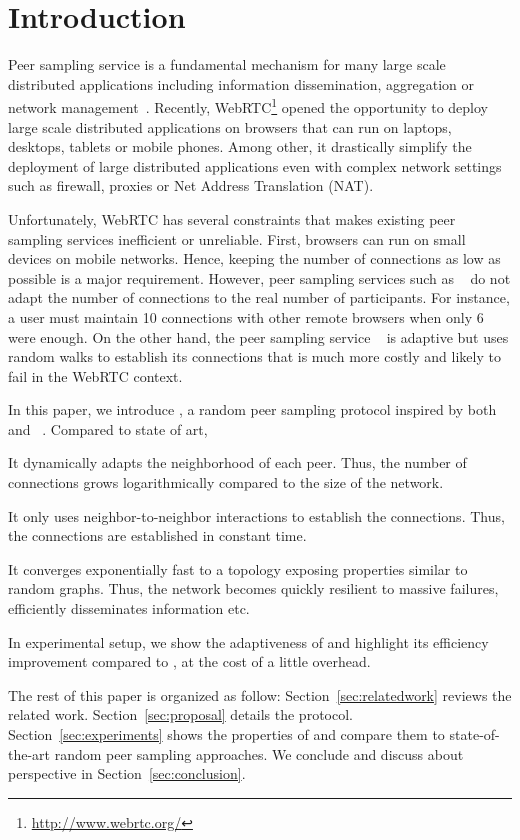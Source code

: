 
\section{Introduction}

Peer sampling service is a fundamental mechanism for many large scale
distributed applications including information dissemination, aggregation
 or network management~\cite{jelasity2007gossip}. Recently,
WebRTC\footnote{\url{http://www.webrtc.org/}} opened the opportunity to deploy large scale distributed
applications on browsers that can run on laptops, desktops, tablets or mobile
phones. Among other, it drastically simplify the deployment of large
distributed applications even with complex network settings such as firewall,
proxies or Net Address Translation (NAT).

Unfortunately, WebRTC has several constraints that makes existing peer
sampling services inefficient or unreliable. First, browsers can run
on small devices on mobile networks. Hence, keeping the number of
connections as low as possible is a major requirement. However, peer
sampling services such as \CYCLON{}~\cite{ voulgaris2005cyclon} do not
adapt the number of connections to the real number of
participants. For instance, a user must maintain 10 connections with
other remote browsers when only 6 were enough. On the other hand, the
peer sampling service \SCAMP{}~\cite{ganesh2003peer} is adaptive but
uses random walks to establish its connections that is much more
costly and likely to fail in the WebRTC context.

In this paper, we introduce \SPRAY{}, a random peer sampling protocol
inspired by both \SCAMP{}~\cite{ganesh2003peer} and
\CYCLON{}~\cite{voulgaris2005cyclon}. Compared to state of art,
\begin{inparaenum}[(i)]
\item It dynamically adapts the neighborhood of each peer. Thus, the number of
  connections grows logarithmically compared to the size of the network.
\item It only uses neighbor-to-neighbor interactions to establish the
  connections. Thus, the connections are established in constant time.
\item It converges exponentially fast to a topology exposing properties similar
  to random graphs. Thus, the network becomes quickly resilient to massive
  failures, efficiently disseminates information etc.
\item In experimental setup, we show the adaptiveness of \SPRAY{} and
  highlight its efficiency improvement compared to \CYCLON{}, at the cost of a
  little overhead.
\end{inparaenum}

The rest of this paper is organized as follow: Section~\ref{sec:relatedwork}
reviews the related work. Section~\ref{sec:proposal} details the \SPRAY{}
protocol.  Section~\ref{sec:experiments} shows the properties of \SPRAY{}
and compare them to state-of-the-art random peer sampling approaches. We
conclude and discuss about perspective in Section~\ref{sec:conclusion}.


